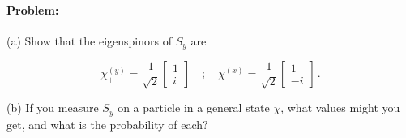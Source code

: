 \documentclass[12pt, titlepage]{article}
\begin{document}
\begin{mdframed}[backgroundcolor=gray!20]
\paragraph*{Problem:} (a) Show that the eigenspinors of $S_y$ are 

\begin{equation}
\chi_+^{(y)} = \frac{1}{\sqrt{2}}\begin{bmatrix} 1 \\ i\end{bmatrix} \quad;\quad \chi_-^{(x)} = \frac{1}{\sqrt{2}}\begin{bmatrix} 1 \\ -i \end{bmatrix} \,.
\end{equation}

(b) If you measure $S_y$ on a particle in a general state $\chi$, what values might you get, and what is the probability of each?
\end{mdframed}
\end{document}
